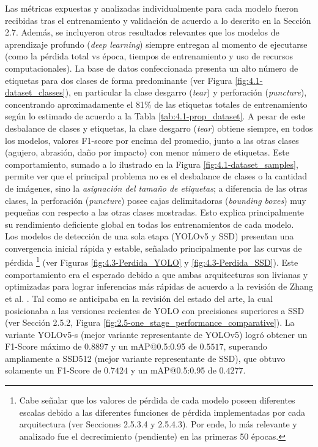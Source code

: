 Las métricas expuestas y analizadas individualmente para cada modelo fueron recibidas tras el entrenamiento y validación de acuerdo a lo descrito en la Sección 2.7. Además, se incluyeron otros resultados relevantes que los modelos de aprendizaje profundo (\textit{deep learning}) siempre entregan al momento de ejecutarse (como la pérdida total vs época, tiempos de entrenamiento y uso de recursos computacionales). La base de datos confeccionada presenta un alto número de etiquetas para dos clases de forma predominante (ver Figura \ref{fig:4.1-dataset_classes}), en particular la clase desgarro (\textit{tear}) y perforación (\textit{puncture}), concentrando aproximadamente el 81\% de las etiquetas totales de entrenamiento según lo estimado de acuerdo a la Tabla \ref{tab:4.1-prop_dataset}. A pesar de este desbalance de clases y etiquetas, la clase desgarro (\textit{tear}) obtiene siempre, en todos los modelos, valores F1-score por encima del promedio, junto a las otras clases (agujero, abrasión, daño por impacto) con menor número de etiquetas. Este comportamiento, sumado a lo ilustrado en la Figura \ref{fig:4.1-dataset_samples}, permite ver que el principal problema no es el desbalance de clases o la cantidad de imágenes, sino la \textit{asignación del tamaño de etiquetas}; a diferencia de las otras clases, la perforación (\textit{puncture}) posee cajas delimitadoras (\textit{bounding boxes}) muy pequeñas con respecto a las otras clases mostradas. Esto explica principalmente su rendimiento deficiente global en todas los entrenamientos de cada modelo. \\


Los modelos de detección de una sola etapa (YOLOv5 y SSD) presentan una convergencia inicial rápida y estable, señalado principalmente por las curvas de pérdida \footnote{Cabe señalar que los valores de pérdida de cada modelo poseen diferentes escalas debido a las diferentes funciones de pérdida implementadas por cada arquitectura (ver Secciones 2.5.3.4 y 2.5.4.3). Por ende, lo más relevante y analizado fue el decrecimiento (pendiente) en las primeras 50 épocas.} (ver Figuras \ref{fig:4.3-Perdida_YOLO} y \ref{fig:4.3-Perdida_SSD}). Este comportamiento era el esperado debido a que ambas arquitecturas son livianas y optimizadas para lograr inferencias más rápidas de acuerdo a la revisión de Zhang et al. \cite{zhang2021one_stage}. Tal como se anticipaba en la revisión del estado del arte, la cual posicionaba a las versiones recientes de YOLO con precisiones superiores a SSD (ver Sección 2.5.2, Figura \ref{fig:2.5-one_stage_performance_comparative}). La variante YOLOv5-s (mejor variante representante de YOLOv5) logró obtener un F1-Score máximo de $0.8897$ y un mAP@0.5:0.95 de $0.5517$, superando ampliamente a SSD512 (mejor variante representante de SSD), que obtuvo solamente un F1-Score de $0.7424$ y un mAP@0.5:0.95 de $0.4277$. \\


